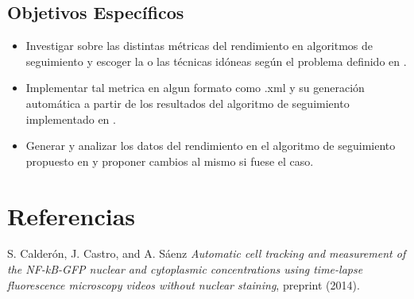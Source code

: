 \documentclass[spanish]{article}
\begin{document}
\subsection{Objetivos Específicos}
\begin{itemize}
\item Investigar sobre las distintas métricas del rendimiento en algoritmos de seguimiento y escoger la o las técnicas idóneas según el problema definido en \cite{Calderon2014}.
\item Implementar tal metrica en algun formato como .xml y su generación automática a partir de los resultados del algoritmo de seguimiento implementado en \cite{Calderon2014}.
\item Generar y analizar los datos  del rendimiento en el algoritmo de seguimiento propuesto en \cite{Calderon2014} y proponer cambios al mismo si fuese el caso.
\end{itemize}


\section{Referencias}
\begin{thebibliography}{9}


 S. Calderón, J. Castro, and A. Sáenz \emph{Automatic cell tracking and measurement of the NF-kB-GFP nuclear and cytoplasmic concentrations using time-lapse fluorescence microscopy videos without nuclear staining}, preprint (2014).



\end{thebibliography}
\end{document}
